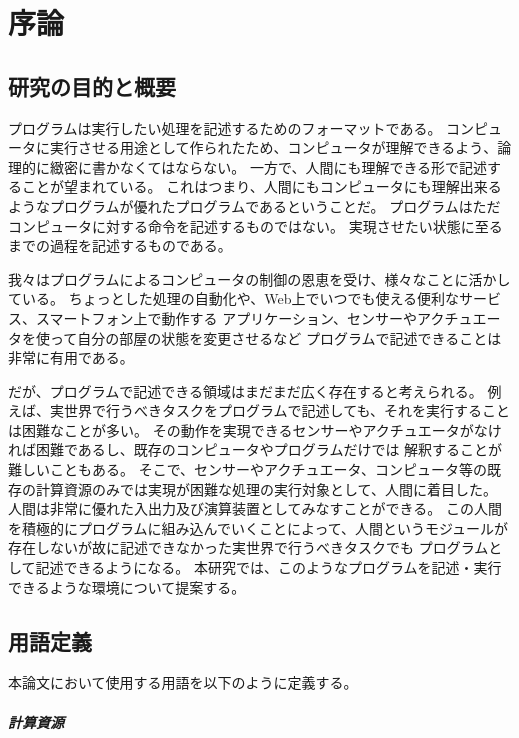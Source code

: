 \chapter{序論}\label{chap:introduction}

\section{研究の目的と概要}\label{ux7814ux7a76ux306eux76eeux7684ux3068ux6982ux8981}

プログラムは実行したい処理を記述するためのフォーマットである。
コンピュータに実行させる用途として作られたため、コンピュータが理解できるよう、論理的に緻密に書かなくてはならない。
一方で、人間にも理解できる形で記述することが望まれている。
これはつまり、人間にもコンピュータにも理解出来るようなプログラムが優れたプログラムであるということだ。
プログラムはただコンピュータに対する命令を記述するものではない。
実現させたい状態に至るまでの過程を記述するものである。

我々はプログラムによるコンピュータの制御の恩恵を受け、様々なことに活かしている。
ちょっとした処理の自動化や、Web上でいつでも使える便利なサービス、スマートフォン上で動作する
アプリケーション、センサーやアクチュエータを使って自分の部屋の状態を変更させるなど
プログラムで記述できることは非常に有用である。

だが、プログラムで記述できる領域はまだまだ広く存在すると考えられる。
例えば、実世界で行うべきタスクをプログラムで記述しても、それを実行することは困難なことが多い。
その動作を実現できるセンサーやアクチュエータがなければ困難であるし、既存のコンピュータやプログラムだけでは
解釈することが難しいこともある。
そこで、センサーやアクチュエータ、コンピュータ等の既存の計算資源のみでは実現が困難な処理の実行対象として、人間に着目した。
人間は非常に優れた入出力及び演算装置としてみなすことができる。
この人間を積極的にプログラムに組み込んでいくことによって、人間というモジュールが存在しないが故に記述できなかった実世界で行うべきタスクでも
プログラムとして記述できるようになる。
本研究では、このようなプログラムを記述・実行できるような環境について提案する。

\section{用語定義}\label{ux7528ux8a9eux5b9aux7fa9}

本論文において使用する用語を以下のように定義する。

\paragraph{計算資源}\label{ux8a08ux7b97ux8cc7ux6e90}

